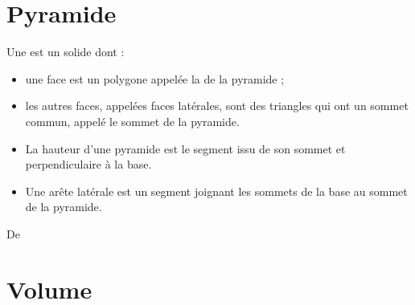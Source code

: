 


\section{Pyramide}

\begin{definition}
    Une  est un solide dont :
    \begin{itemize}
        \item 
            une face est un polygone appelée la  de la pyramide ;
\item
les autres faces, appelées faces latérales, sont des triangles qui ont un sommet commun, appelé le sommet de la pyramide.
    \end{itemize}
\end{definition}


\begin{definition}
    \begin{itemize}
        \item 
La hauteur d'une pyramide est le segment issu de son sommet et perpendiculaire à la base.
\item
Une arête latérale est un segment joignant les sommets de la base au sommet de la pyramide.
    \end{itemize}
\end{definition}




De \cite{NRHooXFvgpp4}

\newpage

\thispagestyle{empty}

\section{Volume}

